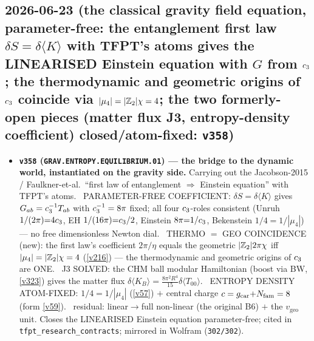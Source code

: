\subsection*{2026-06-23 (the classical gravity field equation, parameter-free: the entanglement first law $\delta S=\delta\langle K\rangle$ with TFPT's atoms gives the LINEARISED Einstein equation with $G$ from $c_3$; the thermodynamic and geometric origins of $c_3$ coincide via $|\mu_4|=|\mathbb{Z}_2|\chi=4$; the two formerly-open pieces (matter flux J3, entropy-density coefficient) closed/atom-fixed: \texttt{v358})}
\begin{itemize}
\item \textbf{\texttt{v358} (\texttt{GRAV.ENTROPY.EQUILIBRIUM.01}) --- the bridge to the dynamic world, instantiated on the
gravity side.} Carrying out the Jacobson-2015 / Faulkner-et-al.\ ``first law of entanglement $\Rightarrow$ Einstein
equation'' with TFPT's atoms. \mE\ PARAMETER-FREE COEFFICIENT: $\delta S=\delta\langle K\rangle$ gives
$G_{ab}=c_3^{-1}T_{ab}$ with $c_3^{-1}=8\pi$ fixed; all four $c_3$-roles consistent (Unruh
$1/(2\pi){=}4c_3$, EH $1/(16\pi){=}c_3/2$, Einstein $8\pi{=}1/c_3$, Bekenstein $1/4{=}1/|\mu_4|$) ---
no free dimensionless Newton dial. \mE\ THERMO $=$ GEO COINCIDENCE (new): the first law's coefficient $2\pi/\eta$
equals the geometric $|\mathbb{Z}_2|2\pi\chi$ iff $|\mu_4|=|\mathbb{Z}_2|\chi=4$ (\vref{v216}) --- the thermodynamic and geometric
origins of $c_3$ are ONE. \mC\ J3 SOLVED: the CHM ball modular Hamiltonian (boost via BW, \vref{v323}) gives the
matter flux $\delta\langle K_B\rangle=\tfrac{8\pi^2R^4}{15}\delta\langle T_{00}\rangle$. \mE\ ENTROPY DENSITY
ATOM-FIXED: $1/4{=}1/|\mu_4|$ (\vref{v57}) $+$ central charge $c=g_{\mathrm{car}}{+}N_{\mathrm{fam}}=8$ (form \vref{v59}). \mO\ residual:
linear$\to$full non-linear (the original B6) $+$ the $v_{\mathrm{geo}}$ unit. Closes the LINEARISED Einstein
equation parameter-free; cited in \texttt{tfpt\_research\_contracts}; mirrored in Wolfram (\texttt{302/302}).
\end{itemize}

